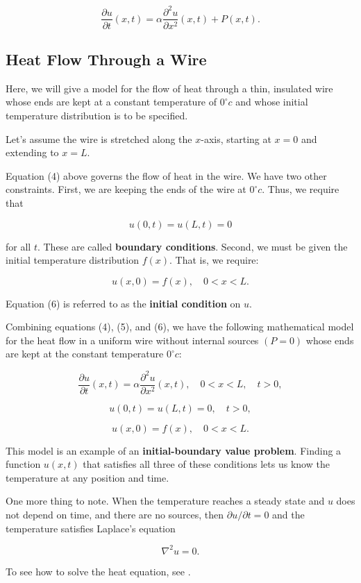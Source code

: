 \documentclass{article}
\begin{document}
\[ \frac{\partial u}{\partial t}(x,t) = \alpha \frac{\partial^2 u}{\partial x^2}(x,t) + P(x,t). \tag{4} \]

\subsection{Heat Flow Through a Wire}

Here, we will give a model for the flow of heat through a thin, insulated wire whose ends are kept at a constant temperature of $0^\circ c$ and whose initial temperature distribution is to be specified.

Let's assume the wire is stretched along the $x$-axis, starting at $x=0$ and extending to $x=L$.

Equation (4) above governs the flow of heat in the wire. We have two other constraints. First, we are keeping the ends of the wire at $0^\circ c.$ Thus, we require that

\[ u(0, t) = u(L, t) = 0 \tag{5} \]

for all $t$. These are called \textbf{boundary conditions}. Second, we must be given the initial temperature distribution $f(x)$. That is, we require:

\[ u(x,0) = f(x), \quad 0 < x < L. \tag{6} \]

Equation (6) is referred to as the \textbf{initial condition} on $u$.

Combining equations (4), (5), and (6), we have the following mathematical model for the heat flow in a uniform wire without internal sources $(P = 0)$ whose ends are kept at the constant temperature $0^\circ c$:

\[ \frac{\partial u}{\partial t}(x,t) = \alpha \frac{\partial^2 u}{\partial x^2}(x,t), \quad 0 < x < L, \quad t > 0, \tag{7} \]

\[ u(0, t) = u(L, t) = 0, \quad t>0, \tag{8} \]

\[ u(x,0) = f(x), \quad 0 < x < L. \tag{9} \]

This model is an example of an \textbf{initial-boundary value problem}. Finding a function $u(x,t)$ that satisfies all three of these conditions lets us know the temperature at any position and time.


One more thing to note. When the temperature reaches a steady state and $u$ does not depend on time, and there are no sources, then $\partial u / \partial t = 0$ and the temperature satisfies Laplace's equation

\[ \nabla^2 u = 0. \]

To see how to solve the heat equation, see .
\end{document}
